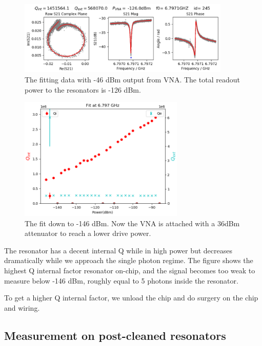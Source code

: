 \begin{figure}[h!]
    \centering
    \includegraphics[width=0.9\textwidth]{Pic/Res_beforeclean_0.png}
    \caption{The fitting data with -46 dBm output from VNA. The total readout power to the resonators is -126 dBm.}
    \label{fig:my_label}
\end{figure}

\begin{figure}[h!]
    \centering
    \includegraphics[width=0.7\textwidth]{Pic/Res_beforeclean.png}
    \caption{The fit down to -146 dBm. Now the VNA is attached with a 36dBm attenuator to reach a lower drive power.}
    \label{Fitallbare}
\end{figure}
The resonator has a decent internal Q while in high power but decreases dramatically while we approach the single photon regime. The figure shows the highest Q internal factor resonator on-chip, and the signal becomes too weak to measure below -146 dBm, roughly equal to 5 photons inside the resonator.

To get a higher Q internal factor, we unload the chip and do surgery on the chip and wiring.

\subsection{Measurement on post-cleaned resonators}

